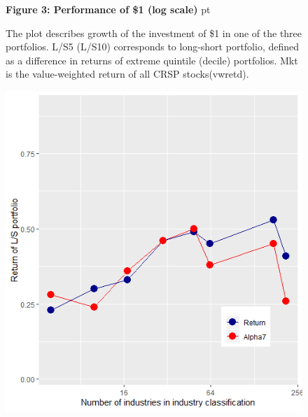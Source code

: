 \documentclass[16pt]{article}
\begin{document}
\begin{figure}
\textbf{Figure 3: Performance of \$1 (log scale)}
 pt
\begin{flushleft}
{The plot describes growth of the investment of \$1 in one of the three portfolios. L/S5 (L/S10) corresponds to long-short portfolio, defined as a difference in returns of extreme quintile (decile) portfolios. Mkt is the value-weighted return of all CRSP stocks(vwretd).}
\end{flushleft}
\centering
\includegraphics[width=1\textwidth]{Figure3.png}
\end{figure}
\end{document}
